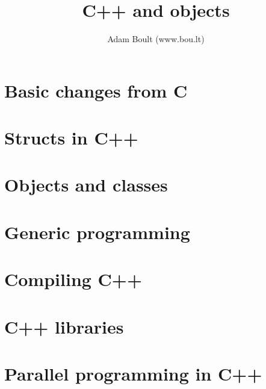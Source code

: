 \documentclass[oneside]{book}
\begin{document}
\author{Adam Boult (www.bou.lt)}
\title{C++ and objects}
\maketitle

\setcounter{tocdepth}{0}
\tableofcontents



\part{Basic changes from C}








\part{Structs in C++}




\part{Objects and classes}



\part{Generic programming}




\part{Compiling C++}



\part{C++ libraries}




\part{Parallel programming in C++}
\end{document}
